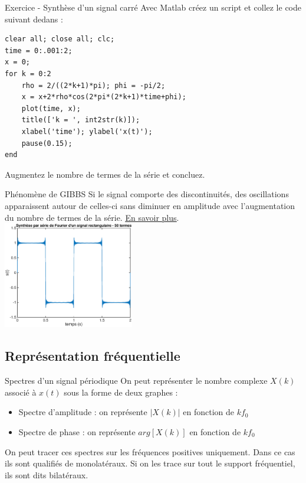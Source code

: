 \documentclass[a4paper,11pt]{beamer}
\newcounter{exampleBlockCounter}
\begin{document}
\begin{frame}[containsverbatim]
\begin{exampleblock}{Exercice
 - Synthèse d'un
signal carré}
Avec Matlab créez un script et collez le code suivant dedans :
\begin{lstlisting}[style=Matlab-editor]
clear all; close all; clc;
time = 0:.001:2;
x = 0;
for k = 0:2
    rho = 2/((2*k+1)*pi); phi = -pi/2; 
    x = x+2*rho*cos(2*pi*(2*k+1)*time+phi);    
    plot(time, x);
    title(['k = ', int2str(k)]);
    xlabel('time'); ylabel('x(t)');
    pause(0.15);
end
\end{lstlisting}
Augmentez le nombre de termes de la série et concluez.
\end{exampleblock}
\end{frame}

\begin{frame}
\begin{alertblock}{Phénomène de GIBBS}
\justify
Si le signal comporte des discontinuités, des oscillations apparaissent autour
de celles-ci sans diminuer en amplitude avec l'augmentation du
nombre de termes de la série.
\href{http://en.wikipedia.org/wiki/Gibbs_phenomenon}{\underline{En savoir
plus}}.
\center
\includegraphics [width=2.25in]{images/Exercice_III_01.eps} 
\vspace{\baselineskip}
\end{alertblock}
\end{frame}


\subsection{Représentation fréquentielle}
\begin{frame}
\begin{block}{Spectres d'un signal périodique}
\justify
On peut représenter le nombre complexe $X(k)$ associé à $x(t)$ sous la forme de
deux graphes :
\begin{itemize}[label=$\bullet$]
  \item \alert{Spectre d'amplitude} : on représente $\lvert X(k) \rvert$ en
  fonction de $kf_0$
  \item \alert{Spectre de phase} : on représente $arg[X(k)]$ en fonction de
  $kf_0$
\end{itemize}
On peut tracer ces \alert{spectres} sur les fréquences positives uniquement.
Dans ce cas ils sont qualifiés de \alert{monolatéraux}. Si on les trace sur tout
le support fréquentiel, ils sont dits \alert{bilatéraux}.
\end{block}
\end{frame}
\end{document}
